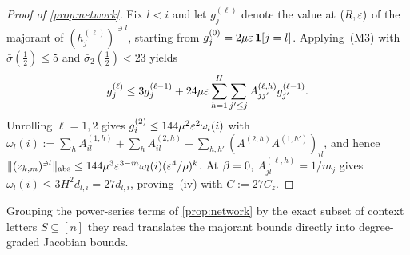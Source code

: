 \begin{proof}[Proof of \cref{prop:network}]
Fix $l < i$ and let $g_j^{(\ell)}$ denote the value at $(R,\varepsilon)$ of the majorant of $(h_j^{(\ell)})^{\ni l}$, starting from $g_j^{(0)} = 2\mu\varepsilon\,\mathbf 1[j = l]$. Applying~(M3) with $\bar\sigma(\frac{1}{2}) \le 5$ and $\bar\sigma_2(\frac{1}{2}) < 23$ yields
\[
  g_j^{(\ell)} \le 3 g_j^{(\ell-1)} + 24\mu\varepsilon\sum_{h=1}^H\sum_{j'\le j} A_{jj'}^{(\ell,h)} g_{j'}^{(\ell-1)}.
\]
Unrolling $\ell = 1, 2$ gives $g_i^{(2)} \le 144\mu^2\varepsilon^2\omega_l(i)$ with $\omega_l(i) := \sum_h A_{il}^{(1,h)} + \sum_h A_{il}^{(2,h)} + \sum_{h,h'}(A^{(2,h)}A^{(1,h')})_{il}$, and hence $\|(z_{k,m})^{\ni l}\|_{\mathrm{abs}} \le 144\mu^3\varepsilon^{3-m}\omega_l(i)(\varepsilon^4/\rho)^k$. At $\beta = 0$, $A_{jl}^{(\ell,h)} = 1/m_j$ gives $\omega_l(i) \le 3H^2 d_{l,i} = 27 d_{l,i}$, proving~(iv) with $C := 27 C_z$.
\end{proof}

Grouping the power-series terms of \cref{prop:network} by the exact subset of context letters $S \subseteq [n]$ they read translates the majorant bounds directly into degree-graded Jacobian bounds.

